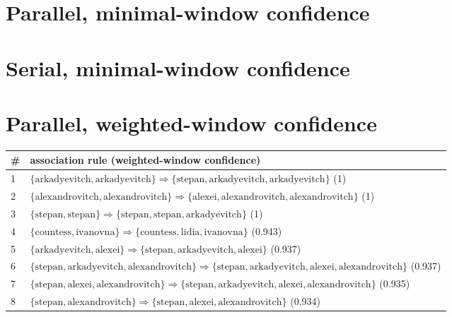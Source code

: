 \begin{appendices}
\section{Parallel, minimal-window confidence}

\section{Serial, minimal-window confidence}

\section{Parallel, weighted-window confidence}

\begin{longtable}{p{20pt}|p{\dimexpr\textwidth-20pt-\tabcolsep\relax}}
\# & association rule (weighted-window confidence) \\
\hline
1 & $ \{ \text{arkadyevitch},\allowbreak\text{arkadyevitch} \} \Rightarrow \{ \text{stepan},\allowbreak\text{arkadyevitch},\allowbreak\text{arkadyevitch} \} $ (1) \\
2 & $ \{ \text{alexandrovitch},\allowbreak\text{alexandrovitch} \} \Rightarrow \{ \text{alexei},\allowbreak\text{alexandrovitch},\allowbreak\text{alexandrovitch} \} $ (1) \\
3 & $ \{ \text{stepan},\allowbreak\text{stepan} \} \Rightarrow \{ \text{stepan},\allowbreak\text{stepan},\allowbreak\text{arkadyevitch} \} $ (1) \\
4 & $ \{ \text{countess},\allowbreak\text{ivanovna} \} \Rightarrow \{ \text{countess},\allowbreak\text{lidia},\allowbreak\text{ivanovna} \} $ (0.943) \\
5 & $ \{ \text{arkadyevitch},\allowbreak\text{alexei} \} \Rightarrow \{ \text{stepan},\allowbreak\text{arkadyevitch},\allowbreak\text{alexei} \} $ (0.937) \\
6 & $ \{ \text{stepan},\allowbreak\text{arkadyevitch},\allowbreak\text{alexandrovitch} \} \Rightarrow \{ \text{stepan},\allowbreak\text{arkadyevitch},\allowbreak\text{alexei},\allowbreak\text{alexandrovitch} \} $ (0.937) \\
7 & $ \{ \text{stepan},\allowbreak\text{alexei},\allowbreak\text{alexandrovitch} \} \Rightarrow \{ \text{stepan},\allowbreak\text{arkadyevitch},\allowbreak\text{alexei},\allowbreak\text{alexandrovitch} \} $ (0.935) \\
8 & $ \{ \text{stepan},\allowbreak\text{alexandrovitch} \} \Rightarrow \{ \text{stepan},\allowbreak\text{alexei},\allowbreak\text{alexandrovitch} \} $ (0.934) \\

\end{longtable}
\end{appendices}
